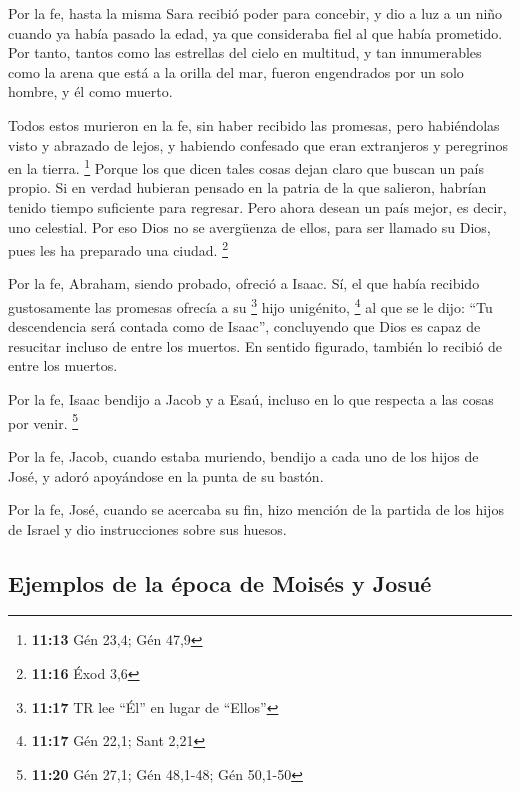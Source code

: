 \begin{paracol}{2}
 Por la fe, hasta la misma Sara recibió poder para
concebir, y dio a luz a un niño cuando ya había pasado la edad, ya que
consideraba fiel al que había prometido.  Por tanto,
tantos como las estrellas del cielo en multitud, y tan innumerables como
la arena que está a la orilla del mar, fueron engendrados por un solo
hombre, y él como muerto.

 Todos estos murieron en la fe, sin haber recibido las
promesas, pero habiéndolas visto y abrazado de lejos, y habiendo
confesado que eran extranjeros y peregrinos en la tierra. \footnote{\textbf{11:13}
  Gén 23,4; Gén 47,9}  Porque los que dicen tales cosas
dejan claro que buscan un país propio.  Si en verdad
hubieran pensado en la patria de la que salieron, habrían tenido tiempo
suficiente para regresar.  Pero ahora desean un país
mejor, es decir, uno celestial. Por eso Dios no se avergüenza de ellos,
para ser llamado su Dios, pues les ha preparado una ciudad. \footnote{\textbf{11:16}
  Éxod 3,6}

 Por la fe, Abraham, siendo probado, ofreció a Isaac. Sí,
el que había recibido gustosamente las promesas ofrecía a su \footnote{\textbf{11:17}
  TR lee ``Él'' en lugar de ``Ellos''} hijo unigénito, \footnote{\textbf{11:17}
  Gén 22,1; Sant 2,21}  al que se le dijo: ``Tu
descendencia será contada como de Isaac'',  concluyendo
que Dios es capaz de resucitar incluso de entre los muertos. En sentido
figurado, también lo recibió de entre los muertos.

 Por la fe, Isaac bendijo a Jacob y a Esaú, incluso en lo
que respecta a las cosas por venir. \footnote{\textbf{11:20} Gén 27,1;
  Gén 48,1-48; Gén 50,1-50}

 Por la fe, Jacob, cuando estaba muriendo, bendijo a cada
uno de los hijos de José, y adoró apoyándose en la punta de su bastón.

 Por la fe, José, cuando se acercaba su fin, hizo mención
de la partida de los hijos de Israel y dio instrucciones sobre sus
huesos.

\hypertarget{ejemplos-de-la-uxe9poca-de-moisuxe9s-y-josuuxe9}{%
\subsection{Ejemplos de la época de Moisés y
Josué}\label{ejemplos-de-la-uxe9poca-de-moisuxe9s-y-josuuxe9}}


\end{paracol}
